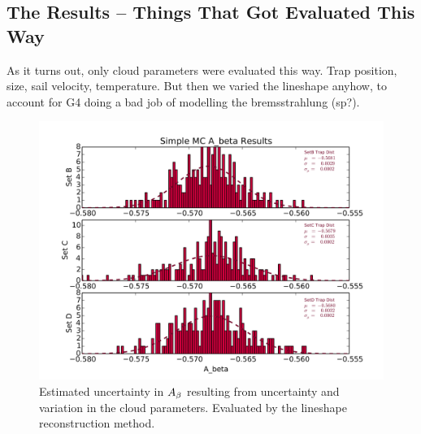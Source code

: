 	\subsection{The Results -- Things That Got Evaluated This Way}
	As it turns out, only cloud parameters were evaluated this way. 
Trap position, size, sail velocity, temperature.  But then we varied the lineshape anyhow, to account for G4 doing a bad job of modelling the bremsstrahlung (sp?).
	
	    \begin{figure}[h!!]
    	\centering
    	\includegraphics[width=.999\linewidth]
    	{Figures/Position_Err_Abeta.png}
    	\caption[$\Abeta$ Position Error]{Estimated uncertainty in $\Abeta$ resulting from uncertainty and variation in the cloud parameters.  Evaluated by the lineshape reconstruction method.}	
    	\label{fig:Abeta_position_err}
		\end{figure}

